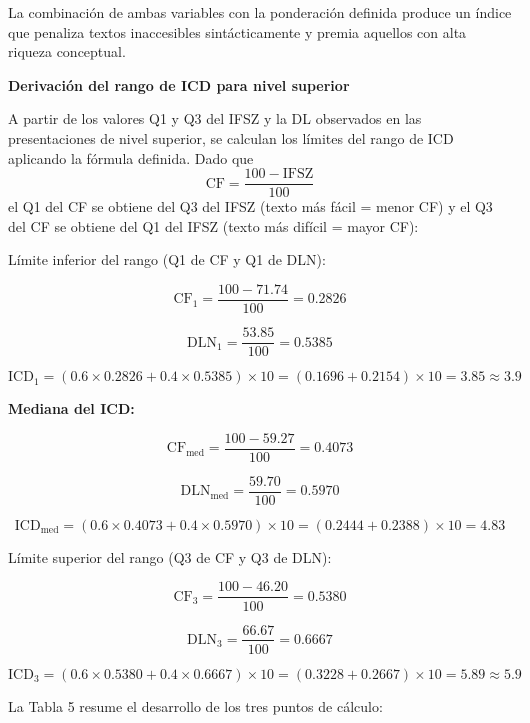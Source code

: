 \documentclass[11pt]{article}
\begin{document}
La combinación de ambas variables con la ponderación definida produce un índice que penaliza textos inaccesibles sintácticamente y premia aquellos con alta riqueza conceptual.

\textbf{Derivación del rango de ICD para nivel superior}

A partir de los valores Q1 y Q3 del IFSZ y la DL observados en las presentaciones de nivel superior, se calculan los límites del rango de ICD aplicando la fórmula definida. Dado que
\[
\mathrm{CF} = \frac{100 - \mathrm{IFSZ}}{100}
\]
el Q1 del CF se obtiene del Q3 del IFSZ (texto más fácil = menor CF) y el Q3 del CF se obtiene del Q1 del IFSZ (texto más difícil = mayor CF):

Límite inferior del rango (Q1 de CF y Q1 de DLN):

\[
\mathrm{CF}_1 = \frac{100 - 71.74}{100} = 0.2826
\]

\[
\mathrm{DLN}_1 = \frac{53.85}{100} = 0.5385
\]

\[
\mathrm{ICD}_1 = (0.6 \times 0.2826 + 0.4 \times 0.5385) \times 10 = (0.1696 + 0.2154) \times 10 = 3.85 \approx 3.9
\]

\textbf{Mediana del ICD:}

\[
\mathrm{CF}_{\mathrm{med}} = \frac{100 - 59.27}{100} = 0.4073
\]

\[
\mathrm{DLN}_{\mathrm{med}} = \frac{59.70}{100} = 0.5970
\]

\[
\mathrm{ICD}_{\mathrm{med}} = (0.6 \times 0.4073 + 0.4 \times 0.5970) \times 10 = (0.2444 + 0.2388) \times 10 = 4.83
\]

Límite superior del rango (Q3 de CF y Q3 de DLN):

\[
\mathrm{CF}_3 = \frac{100 - 46.20}{100} = 0.5380
\]

\[
\mathrm{DLN}_3 = \frac{66.67}{100} = 0.6667
\]

\[
\mathrm{ICD}_3 = (0.6 \times 0.5380 + 0.4 \times 0.6667) \times 10 = (0.3228 + 0.2667) \times 10 = 5.89 \approx 5.9
\]

La Tabla 5 resume el desarrollo de los tres puntos de cálculo:
\end{document}
